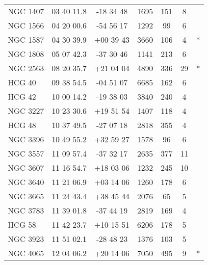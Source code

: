 \begin{table*}
\begin{center}
\begin{tabular}{@{}lcccccr@{}}
NGC 1407  &  03 40 11.8  &  -18 34 48  &  1695      &  151        &  8        &  \citet{garcia93}      \\
NGC 1566  &  04 20 00.6  &  -54 56 17  &  1292      &  99         &  6        &  \citet{garcia93}      \\
NGC 1587  &  04 30 39.9  &  +00 39 43  &  3660      &  106        &  4        &  *\citet{nolthenius93} \\
NGC 1808  &  05 07 42.3  &  -37 30 46  &  1141      &  213        &  6        &  \citet{giudice99}     \\
NGC 2563  &  08 20 35.7  &  +21 04 04  &  4890      &  336        &  29       &  *\citet{mulchaey98}   \\
HCG 40    &  09 38 54.5  &  -04 51 07  &  6685      &  162        &  6        &  \citet{hickson82}     \\
HCG 42    &  10 00 14.2  &  -19 38 03  &  3840      &  240        &  4        &  \citet{hickson82}     \\
NGC 3227  &  10 23 30.6  &  +19 51 54  &  1407      &  118        &  4        &  \citet{ramella97}     \\
HCG 48    &  10 37 49.5  &  -27 07 18  &  2818      &  355        &  4        &  \citet{hickson82}     \\
NGC 3396  &  10 49 55.2  &  +32 59 27  &  1578      &  96         &  6        &  \citet{garcia93}      \\
NGC 3557  &  11 09 57.4  &  -37 32 17  &  2635      &  377        &  11       &  \citet{garcia93}      \\
NGC 3607  &  11 16 54.7  &  +18 03 06  &  1232      &  245        &  10       &  \citet{ramella97}     \\
NGC 3640  &  11 21 06.9  &  +03 14 06  &  1260      &  178        &  6        &  \citet{garcia93}      \\
NGC 3665  &  11 24 43.4  &  +38 45 44  &  2076      &  65         &  5        &  \citet{garcia93}      \\
NGC 3783  &  11 39 01.8  &  -37 44 19  &  2819      &  169        &  4        &  \citet{giudice99}     \\
HCG 58    &  11 42 23.7  &  +10 15 51  &  6206      &  178        &  5        &  \citet{hickson82}     \\
NGC 3923  &  11 51 02.1  &  -28 48 23  &  1376      &  103        &  5        &  \citet{garcia93}      \\
NGC 4065  &  12 04 06.2  &  +20 14 06  &  7050      &  495        &  9        &  *\citet{ledlow96}     \\

\end{tabular}
\end{center}
\end{table*}
